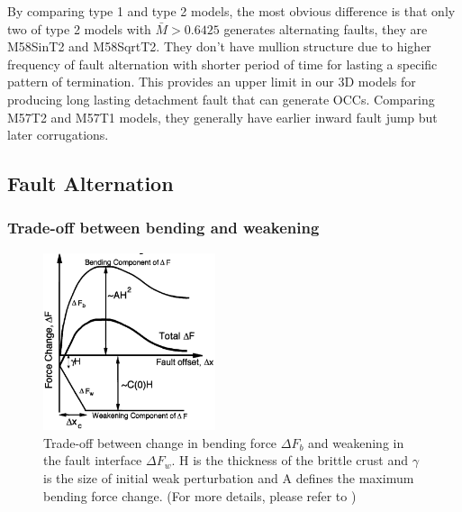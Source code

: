 By comparing type 1 and type 2 models, the most obvious difference is that only two of type 2 models with $\bar{M}>0.6425$ generates alternating faults, they are M58SinT2 and M58SqrtT2. They don't have mullion structure due to higher frequency of fault alternation with shorter period of time for lasting a specific pattern of termination. This provides an upper limit in our 3D models for producing long lasting detachment fault that can generate OCCs. Comparing M57T2 and M57T1 models, they generally have earlier inward fault jump but later corrugations.







\subsection{Fault Alternation}

\subsubsection{Trade-off between bending and weakening}

\begin{figure}[h]
 \centering
  \includegraphics[width=0.45\textwidth]{./Figures/fig_Results_Weakening_1_tradeOff_bend_weak.png}
 \caption{Trade-off between change in bending force $\Delta F_{b}$ and weakening in the fault interface $\Delta F_{w}$. H is the thickness of the brittle crust and $\gamma$ is the size of initial weak perturbation and A defines the maximum bending force change. (For more details, please refer to \citep{Lavier2000})}
 \label{fig_Results_Weakening_1}
\end{figure}

